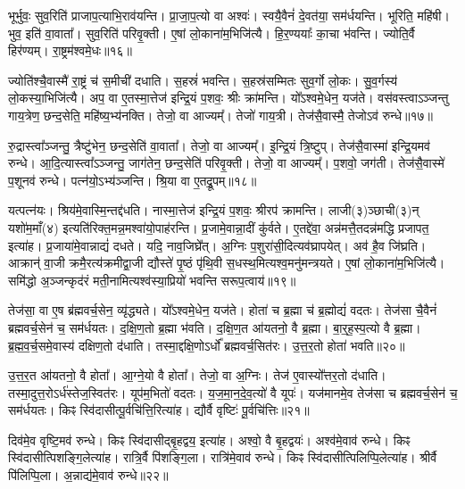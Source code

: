 भूर्भुवः॒ सुव॒रिति॑ प्राजाप॒त्याभि॒राव॑यन्ति।
प्रा॒जा॒प॒त्यो वा अश्वः॑।
स्वयै॒वैनं॑ दे॒वत॑या॒ सम॑र्धयन्ति।
भूरिति॒ महि॑षी।
भुव॒ इति॑ वा॒वाता᳚।
सुव॒रिति॑ परिवृ॒क्ती।
ए॒षां लो॒काना॑म॒भिजि॑त्यै।
हि॒र॒ण्ययाः᳚ का॒चा भ॑वन्ति।
ज्योति॒र्वै हिर॑ण्यम्।
रा॒ष्ट्रम॑श्वमे॒धः॥१६॥

ज्योति॑श्चै॒वास्मै॑ रा॒ष्ट्रं च॑ स॒मीची॑ दधाति।
स॒हस्रं॑ भवन्ति।
स॒हस्र॑सम्मितः सुव॒र्गो लो॒कः।
सु॒व॒र्गस्य॑ लो॒कस्या॒भिजि॑त्यै।
अप॒ वा ए॒तस्मा॒त्तेज॑ इन्द्रि॒यं प॒शवः॒ श्रीः क्रा॑मन्ति।
यो᳚ऽश्वमे॒धेन॒ यज॑ते।
वस॑वस्त्वा\-ऽञ्जन्तु गाय॒त्रेण॒ छन्द॒सेति॒ महि॑ष्य॒भ्य॑नक्ति।
तेजो॒ वा आज्यम्᳚।
तेजो॑ गाय॒त्री।
तेज॑सै॒वास्मै॒ तेजो\-ऽव॑ रुन्धे॥१७॥

रु॒द्रास्त्वा᳚ञ्जन्तु॒ त्रैष्टु॑भेन॒ छन्द॒सेति॑ वा॒वाता᳚।
तेजो॒ वा आज्यम्᳚।
इ॒न्द्रि॒यं त्रि॒ष्टुप्।
तेज॑सै॒वास्मा॑ इन्द्रि॒यमव॑ रुन्धे।
आ॒दि॒त्यास्त्वा᳚\-ऽञ्जन्तु॒ जाग॑तेन॒ छन्द॒सेति॑ परिवृ॒क्ती।
तेजो॒ वा आज्यम्᳚।
प॒शवो॒ जग॑ती।
तेज॑सै॒वास्मे॑ प॒शूनव॑ रुन्धे।
पत्न॑यो॒\-ऽभ्य॑ञ्जन्ति।
श्रि॒या वा ए॒तद्रू॒पम्॥१८॥

यत्पत्न॑यः।
श्रिय॑मे॒वास्मि॒न्तद्द॑धति।
नास्मा॒त्तेज॑ इन्द्रि॒यं प॒शवः॒ श्रीरप॑ क्रामन्ति।
लाजी(३)ञ्छाची(३)न् यशो॑म॒माँ(४) इत्यति॑रिक्त॒मन्न॒मश्वा॑यो॒पाह॑रन्ति।
प्र॒जामे॒वान्ना॒दीं कु॑र्वते।
ए॒तद्दे॑वा॒ अन्न॑मत्तै॒तदन्न॑मद्धि प्रजापत॒ इत्या॑ह।
प्र॒जाया॑मे॒वान्नाद्यं॑ दधते।
यदि॒ नाव॒जिघ्रे᳚त्।
अ॒ग्निः प॒शुरा॑सी॒दित्यव॑घ्रापयेत्।
अव॑ है॒व जि॑घ्रति।
आक्रान्॑ वा॒जी क्रमै॒रत्य॑क्रमीद्वा॒जी द्यौस्ते॑ पृ॒ष्ठं पृ॑थि॒वी स॒धस्थ॒मित्यश्व॒मनु॑मन्त्रयते।
ए॒षां लो॒काना॑म॒भिजि॑त्यै।
समि॑द्धो अ॒ञ्जन्कृद॑रं मती॒नामित्यश्व॑स्या॒प्रियो॑ भवन्ति सरूप॒त्वाय॑॥१९॥\anuvakamend[परि॑त॒स्थुष॒ इत्या॑हे॒मे ए॒वास्मै॑ युनक्त्य॒भिजि॑त्यै भरन्त्यश्वमे॒धो रु॑न्धे रू॒पञ्जि॑घ्रति॒ त्रीणि॑ च]

तेज॑सा॒ वा ए॒ष ब्र॑ह्म\-वर्च॒सेन॒ व्यृ॑द्ध्यते।
यो᳚ऽश्वमे॒धेन॒ यज॑ते।
होता॑ च ब्र॒ह्मा च॑ ब्र॒ह्मोद्यं॑ वदतः।
तेज॑सा चै॒वैनं॑ ब्रह्मवर्च॒सेन॑ च॒ सम॑र्धयतः।
द॒क्षि॒ण॒तो ब्र॒ह्मा भ॑वति।
द॒क्षि॒ण॒त आ॑यतनो॒ वै ब्र॒ह्मा।
बा॒र्॒ह॒स्प॒त्यो वै ब्र॒ह्मा।
ब्र॒ह्म॒व॒र्च॒समे॒वास्य॑ दक्षिण॒तो द॑धाति।
तस्मा॒द्दक्षि॒णो\-ऽर्धो᳚ ब्रह्मवर्च॒सित॑रः।
उ॒त्त॒र॒तो होता॑ भवति॥२०॥

उ॒त्त॒र॒त आ॑यतनो॒ वै होता᳚।
आ॒ग्ने॒यो वै होता᳚।
तेजो॒ वा अ॒ग्निः।
तेज॑ ए॒वास्यो᳚त्तर॒तो द॑धाति।
तस्मा॒दुत्त॒रो\-ऽर्ध॑स्तेज॒स्वित॑रः।
यूप॑म॒भितो॑ वदतः।
य॒ज॒मा॒न॒दे॒व॒त्यो॑ वै यूपः॑।
यज॑मानमे॒व तेज॑सा च ब्रह्मवर्च॒सेन॑ च॒ सम॑र्धयतः।
किꣴ स्वि॑दासीत्पू॒र्वचि॑त्ति॒रित्या॑ह।
द्यौर्वै वृष्टिः॑ पू॒र्वचि॑त्तिः॥२१॥

दिव॑मे॒व वृष्टि॒मव॑ रुन्धे।
किꣴ स्वि॑दासीद्बृ॒हद्वय॒ इत्या॑ह।
अश्वो॒ वै बृ॒हद्वयः॑।
अश्व॑मे॒वाव॑ रुन्धे।
किꣴ स्वि॑दासीत्पिशङ्गि॒लेत्या॑ह।
रात्रि॒र्वै पि॑शङ्गि॒ला।
रात्रि॑मे॒वाव॑ रुन्धे।
किꣴ स्वि॑दासीत्पिलिप्पि॒ले\-त्या॑ह।
श्रीर्वै पि॑लिप्पि॒ला।
अ॒न्नाद्य॑मे॒वाव॑ रुन्धे॥२२॥

